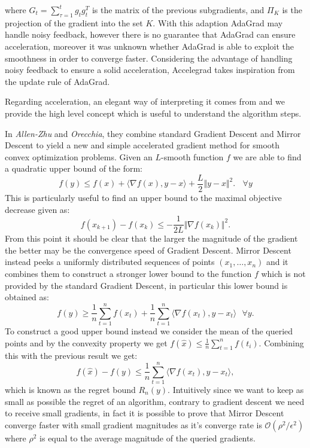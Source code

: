 \documentclass[12pt]{article}
\theoremstyle{definition}
\begin{document}
where $G_t = \sum_{\tau=1}^t g_t g_t^T $ is the matrix of the previous subgradients, and $\Pi_K$ is the projection of the gradient into the set $K$. 
With this adaption AdaGrad may handle noisy feedback, however there is no guarantee that AdaGrad can ensure acceleration, moreover it was unknown whether AdaGrad is able to exploit the smoothness in order to converge faster. Considering the advantage of handling noisy feedback to ensure a solid acceleration, Accelegrad takes inspiration from the update rule of AdaGrad. 

Regarding acceleration, an elegant way of interpreting it comes from \cite{linearcup} and we provide the high level concept which is useful to understand the algorithm steps. 

In \emph{Allen-Zhu} and \emph{Orecchia}, they combine standard Gradient Descent and Mirror Descent to yield a new and simple accelerated gradient method for smooth convex optimization problems.
Given an $L$-smooth function $f$ we are able to find a quadratic upper bound of the form:
$$
f(y) \leq f(x) + \langle \nabla f(x),y-x \rangle + \frac{L}{2} \Vert y - x \Vert^2. \ \ \ \ \forall y
$$
This is particularly useful to find an upper bound to the maximal objective decrease given as:
$$
f(x_{k+1})-f(x_k) \leq - \frac{1}{2L}\Vert \nabla f(x_k) \Vert^2.
$$
From this point it should be clear that the larger the magnitude of the gradient the better may be the convergence speed of Gradient Descent. Mirror Descent instead peeks a uniformly distributed sequences of points $(x_1,\dots,x_n)$ and it combines them to construct a stronger lower bound to the function $f$ which is not provided by the standard Gradient Descent, in particular this lower bound is obtained as: 
$$
f(y) \geqslant \frac{1}{n} \sum_{t=1}^{n} f(x_t) + \frac{1}{n} \sum_{t=1}^{n} \langle \nabla f(x_t), y-x_t \rangle \ \ \ \forall y.
$$
To construct a good upper bound instead we consider the mean of the queried points and by the convexity property we get $f(\hat x) \leq \frac{1}{n} \sum_{t=1}^n f(t_i)$. Combining this with the previous result we get:
$$
f(\hat x) - f(y) \leq \frac{1}{n} \sum_{t=1}^{n} \langle \nabla f(x_t), y-x_t \rangle, 
$$ 
which is known as the regret bound $R_n(y)$. Intuitively since we want to keep as small as possible the regret of an algorithm, contrary to gradient descent we need to receive small gradients, in fact it is possible to prove that Mirror Descent converge faster with small gradient magnitudes as it's converge rate is $\mathcal{O}(\rho^2/\epsilon^2)$ where $\rho^2$  is equal to the average magnitude of the queried gradients.
\end{document}
